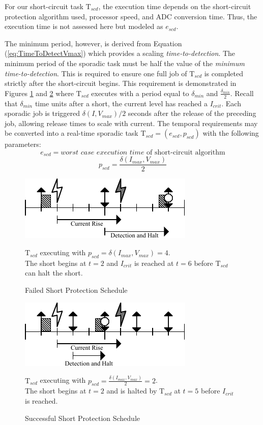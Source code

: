 For our short-circuit task $\mathrm{T}_{scd}$, the execution time depends on the short-circuit protection algorithm used, processor speed, and ADC conversion time. Thus, the execution time is not assessed here but modeled as $e_{scd}$.

The minimum period, however, is derived from Equation (\ref{eq:TimeToDetectVmax}) which provides a scaling \textit{time-to-detection}. The minimum period of the sporadic task must be half the value of the \textit{minimum time-to-detection}. This is required to ensure one full job of $\mathrm{T}_{scd}$ is completed strictly after the short-circuit begins. This requirement is demonstrated in Figures \ref{fig:shortedschedule} and \ref{fig:stoppedschedule} where $\mathrm{T}_{scd}$ executes with a period equal to $\delta_{min}$ and $\frac{\delta_{min}}{2}$. Recall that $\delta_{min}$ time units after a short, the current level has reached a $I_{crit}$. Each sporadic job is triggered $\delta(I,V_{max})/2$ seconds after the release of the preceding job, allowing release times to scale with current. The temporal requirements may be converted into a real-time sporadic task $\mathrm{T}_{scd} = (e_{scd}, p_{scd})$ with the following parameters:
\begin{equation}\label{eq:ExecutionTime}
e_{scd} = \textit{worst case execution time }\text{of short-circuit algorithm}
\end{equation}
\begin{equation}\label{eq:Period}
p_{scd} = \frac{\delta(I_{max},V_{max})}{2}
\end{equation}
\begin{figure}
    \centering
    \includegraphics[width=0.60\linewidth]{img/shortedschedule.pdf}
    \caption{Failed Short Protection Schedule} $\mathrm{T}_{scd}$ executing with $p_{scd} = \delta(I_{max},V_{max}) = 4$.\\The short begins at $t = 2$ and $I_{crit}$ is reached at $t = 6$ before $\mathrm{T}_{scd}$ can halt the short.
    \label{fig:shortedschedule}
\end{figure}
\begin{figure}
    \centering
    \includegraphics[width=0.60\linewidth]{img/stoppedschedule.pdf}
    \caption{Successful Short Protection Schedule} $\mathrm{T}_{scd}$ executing with $p_{scd} = \frac{\delta(I_{max},V_{max})}{2} = 2$.\\The short begins at $t = 2$ and is halted by $\mathrm{T}_{scd}$ at $t = 5$ before $I_{crit}$ is reached.
    \label{fig:stoppedschedule}
\end{figure}
